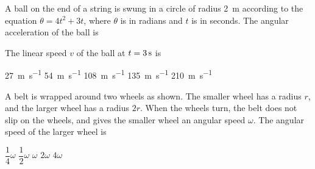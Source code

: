 \documentclass{../../oss-classkick-exam}
\begin{document}
\begin{multicols*}{2}
\begin{questions}

    \question A ball on the end of a string is swung in a circle of radius
    \SI{2}{\metre} according to the equation $\theta = 4t^2+3t$, where $\theta$
    is in radians and $t$ is in seconds. The angular acceleration of the ball
    is
    \label{rad1}
    
    \question The linear speed $v$ of the ball at $t=\SI3\second$ is
    \begin{choices}
      \choice \SI{27}{\metre\per\second}
      \choice \SI{54}{\metre\per\second}
      \choice \SI{108}{\metre\per\second}
      \choice \SI{135}{\metre\per\second}
      \choice \SI{210}{\metre\per\second}
    \end{choices}
    \label{rad2}
    \columnbreak
    
    \question A belt is wrapped around two wheels as shown. The smaller wheel
    has a radius $r$, and the larger wheel has a radius $2r$. When the wheels
    turn, the belt does not slip on the wheels, and gives the smaller wheel an
    angular speed $\omega$. The angular speed of the larger wheel is
    \begin{choices}
      \choice $\dfrac14\omega$
      \choice $\dfrac12\omega$
      \choice $\omega$
      \choice $2\omega$
      \choice $4\omega$
    \end{choices}



\end{questions}
\end{multicols*}
\end{document}
